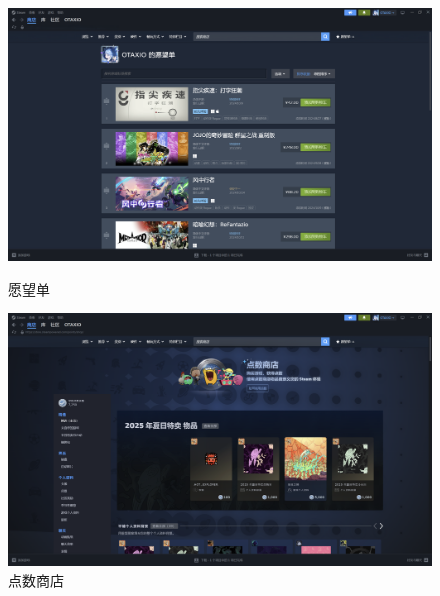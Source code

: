 \documentclass{article}
\begin{document}
        \begin{figure}[H]
            \centering
            \begin{minipage}{0.48\textwidth}
                \centering
                \includegraphics[width=\linewidth]{图/愿望单.png}
                \caption{愿望单}
                \label{fig:愿望单}
            \end{minipage}
            \hfill
            \begin{minipage}{0.48\textwidth}
                \centering
                \includegraphics[width=\linewidth]{图/点数商店.png}
                \caption{点数商店}
                \label{fig:点数商店}
            \end{minipage}
        \end{figure}
        
\end{document}

